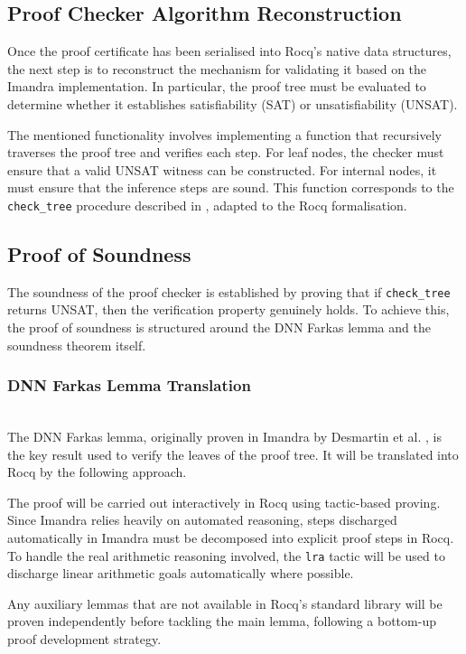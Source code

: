 \subsection{Proof Checker Algorithm Reconstruction}

Once the proof certificate has been serialised into Rocq's native data structures, the next step is to reconstruct the mechanism for validating it based on the Imandra implementation. In particular, the proof tree must be evaluated to determine whether it establishes satisfiability (SAT) or unsatisfiability (UNSAT).

The mentioned functionality involves implementing a function that recursively traverses the proof tree and verifies each step. For leaf nodes, the checker must ensure that a valid UNSAT witness can be constructed. For internal nodes, it must ensure that the inference steps are sound. This function corresponds to the \texttt{check\_tree} procedure described in \cite{certified_proof_checker}, adapted to the Rocq formalisation.

\subsection{Proof of Soundness}

The soundness of the proof checker is established by proving that if \texttt{check\_tree} returns UNSAT, then the verification property genuinely holds. To achieve this, the proof of soundness is structured around the DNN Farkas lemma and the soundness theorem itself.

\subsubsection{DNN Farkas Lemma Translation} \mbox{} \\
The DNN Farkas lemma, originally proven in Imandra by Desmartin et al. \cite{certified_proof_checker}, is the key result used to verify the leaves of the proof tree. It will be translated into Rocq by the following approach.

The proof will be carried out interactively in Rocq using tactic-based proving. Since Imandra relies heavily on automated reasoning, steps discharged automatically in Imandra must be decomposed into explicit proof steps in Rocq. To handle the real arithmetic reasoning involved, the \texttt{lra} tactic will be used to discharge linear arithmetic goals automatically where possible.

Any auxiliary lemmas that are not available in Rocq's standard library will be proven independently before tackling the main lemma, following a bottom-up proof development strategy.

